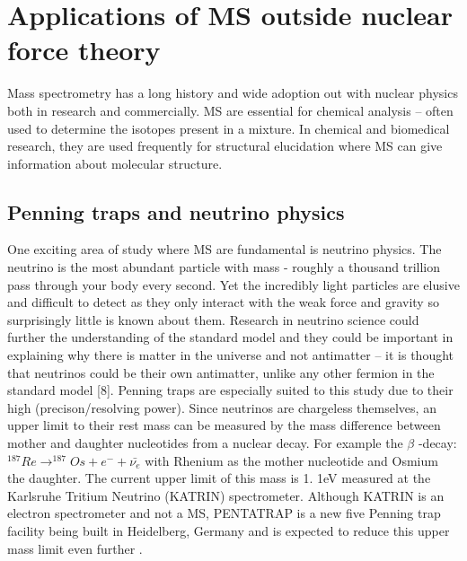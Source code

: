 \section{Applications of MS outside nuclear force theory}

Mass spectrometry has a long history and wide adoption out with nuclear physics both in research and commercially.
MS are essential for chemical analysis – often used to determine the isotopes present in a mixture.
In chemical and biomedical research, they are used frequently for structural elucidation where MS can give information about molecular structure. \cite{bhattarai_chapter_2020}

\subsection{Penning traps and neutrino physics}
One exciting area of study where MS are fundamental is neutrino physics.
The neutrino is the most abundant particle with mass - roughly a thousand trillion pass through your body every second. \cite{noauthor_whats_nodate}
Yet the incredibly light particles are elusive and difficult to detect as they only interact with the weak force and gravity so surprisingly little is known about them. \cite{noauthor_what_nodate}
Research in neutrino science could further the understanding of the standard model and they could be important in explaining why there is matter in the universe and not antimatter \cite{gibney_morphing_2015} – it is thought that neutrinos could be their own antimatter, unlike any other fermion in the standard model [8]. 
Penning traps are especially suited to this study due to their high (precison/resolving power).
Since neutrinos are chargeless themselves, an upper limit to their rest mass can be measured by the mass difference between mother and daughter nucleotides from a nuclear decay. \cite{eliseev_penning-trap_2013}
For example the $\beta$ -decay: $^{187}Re \longrightarrow ^{187}Os + e^- + \bar{\nu _e}$ with Rhenium as the mother nucleotide and Osmium the daughter. \cite{repp_pentatrap_2012}
The current upper limit of this mass is 1.
1eV measured at the Karlsruhe Tritium Neutrino (KATRIN) spectrometer. \cite{castelvecchi_physicists_2019}
Although KATRIN is an electron spectrometer and not a MS, PENTATRAP is a new five Penning trap facility being built in Heidelberg, Germany and is expected to reduce this upper mass limit even further \cite{repp_pentatrap_2012}.

